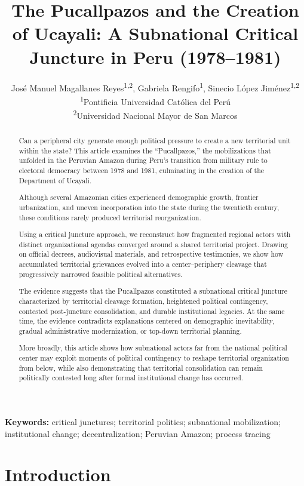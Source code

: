 \documentclass[12pt]{article}
\title{The Pucallpazos and the Creation of Ucayali: A Subnational Critical Juncture in Peru (1978--1981)}
\author{\small
  José Manuel Magallanes Reyes\textsuperscript{1,2}, 
  Gabriela Rengifo\textsuperscript{1}, 
  Sinecio López Jiménez\textsuperscript{1,2} \\
  \textsuperscript{1}{\footnotesize Pontificia Universidad Católica del Perú} \\
  \textsuperscript{2}{\footnotesize Universidad Nacional Mayor de San Marcos}
}
\date{}
\begin{document}
\maketitle

\begin{abstract}

Can a peripheral city generate enough political pressure to create a new territorial unit within the state? This article examines the ``Pucallpazos,'' the mobilizations that unfolded in the Peruvian Amazon during Peru’s transition from military rule to electoral democracy between 1978 and 1981, culminating in the creation of the Department of Ucayali.

Although several Amazonian cities experienced demographic growth, frontier urbanization, and uneven incorporation into the state during the twentieth century, these conditions rarely produced territorial reorganization.

Using a critical juncture approach, we reconstruct how fragmented regional actors with distinct organizational agendas converged around a shared territorial project. Drawing on official decrees, audiovisual materials, and retrospective testimonies, we show how accumulated territorial grievances evolved into a center--periphery cleavage that progressively narrowed feasible political alternatives.

The evidence suggests that the Pucallpazos constituted a subnational critical juncture characterized by territorial cleavage formation, heightened political contingency, contested post-juncture consolidation, and durable institutional legacies. At the same time, the evidence contradicts explanations centered on demographic inevitability, gradual administrative modernization, or top-down territorial planning.

More broadly, this article shows how subnational actors far from the national political center may exploit moments of political contingency to reshape territorial organization from below, while also demonstrating that territorial consolidation can remain politically contested long after formal institutional change has occurred.

\end{abstract}

\noindent
{\footnotesize
\textbf{Keywords:} critical junctures; territorial politics; subnational mobilization; institutional change; decentralization; Peruvian Amazon; process tracing
}
\newpage

\section{Introduction}
\end{document}
